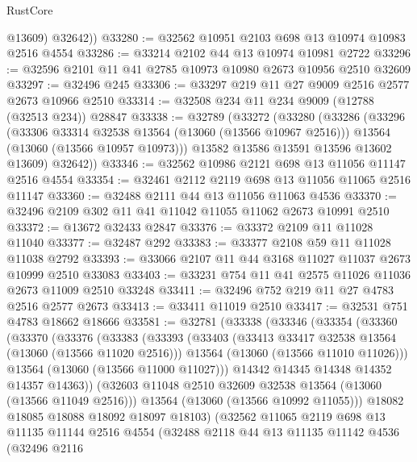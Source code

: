 \begin{lexlean}{RustCore}
\begin{coremodule}
          @13609)
        @32642))
@33280 := @32562 @10951 @2103 @698 @13 @10974 @10983 @2516 @4554
@33286 := @33214 @2102 @44 @13 @10974 @10981 @2722
@33296 := @32596 @2101 @11 @41 @2785 @10973 @10980 @2673 @10956 @2510 @32609
@33297 := @32496 @245
@33306 := @33297 @219 @11 @27 @9009 @2516 @2577 @2673 @10966 @2510
@33314 := @32508 @234 @11 @234 @9009 (@12788 (@32513 @234)) @28847
@33338 := @32789
    (@33272
      (@33280
        (@33286
          (@33296
            (@33306 @33314 @32538 @13564 (@13060 (@13566 @10967 @2516)))
            @13564
            (@13060 (@13566 @10957 @10973)))
          @13582
          @13586
          @13591
          @13596
          @13602
          @13609)
        @32642))
@33346 := @32562 @10986 @2121 @698 @13 @11056 @11147 @2516 @4554
@33354 := @32461 @2112 @2119 @698 @13 @11056 @11065 @2516 @11147
@33360 := @32488 @2111 @44 @13 @11056 @11063 @4536
@33370 := @32496 @2109 @302 @11 @41 @11042 @11055 @11062 @2673 @10991 @2510
@33372 := @13672 @32433 @2847
@33376 := @33372 @2109 @11 @11028 @11040
@33377 := @32487 @292
@33383 := @33377 @2108 @59 @11 @11028 @11038 @2792
@33393 := @33066 @2107 @11 @44 @3168 @11027 @11037 @2673 @10999 @2510 @33083
@33403 := @33231 @754 @11 @41 @2575 @11026 @11036 @2673 @11009 @2510 @33248
@33411 := @32496 @752 @219 @11 @27 @4783 @2516 @2577 @2673
@33413 := @33411 @11019 @2510
@33417 := @32531 @751 @4783 @18662 @18666
@33581 := @32781
    (@33338
      (@33346
        (@33354
          (@33360
            (@33370
              (@33376
                (@33383
                  (@33393
                    (@33403
                      (@33413 @33417 @32538 @13564 (@13060 (@13566 @11020 @2516)))
                      @13564
                      (@13060 (@13566 @11010 @11026)))
                    @13564
                    (@13060 (@13566 @11000 @11027)))
                  @14342
                  @14345
                  @14348
                  @14352
                  @14357
                  @14363))
              (@32603 @11048 @2510 @32609 @32538 @13564 (@13060 (@13566 @11049 @2516)))
              @13564
              (@13060 (@13566 @10992 @11055)))
            @18082
            @18085
            @18088
            @18092
            @18097
            @18103)
          (@32562
            @11065
            @2119
            @698
            @13
            @11135
            @11144
            @2516
            @4554
            (@32488
              @2118
              @44
              @13
              @11135
              @11142
              @4536
              (@32496
                @2116

\end{coremodule}
\end{lexlean}
